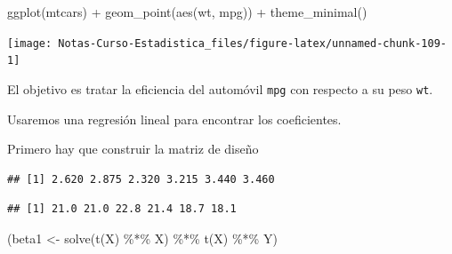 \documentclass[
  12pt,
]{book}
\newenvironment{Shaded}{\begin{snugshade}}{\end{snugshade}}
\newcommand{\FunctionTok}[1]{\textcolor[rgb]{0.00,0.00,0.00}{#1}}
\newcommand{\NormalTok}[1]{#1}
\newcommand{\OtherTok}[1]{\textcolor[rgb]{0.56,0.35,0.01}{#1}}
\newcommand{\SpecialCharTok}[1]{\textcolor[rgb]{0.00,0.00,0.00}{#1}}
\begin{document}
\begin{Shaded}
\begin{Highlighting}[]
\FunctionTok{ggplot}\NormalTok{(mtcars) }\SpecialCharTok{+} \FunctionTok{geom\_point}\NormalTok{(}\FunctionTok{aes}\NormalTok{(wt, mpg)) }\SpecialCharTok{+} \FunctionTok{theme\_minimal}\NormalTok{()}
\end{Highlighting}
\end{Shaded}

\begin{center}\texttt{[image: Notas-Curso-Estadistica\_files/figure-latex/unnamed-chunk-109-1]} \end{center}

El objetivo es tratar la eficiencia del automóvil \texttt{mpg} con
respecto a su peso \texttt{wt}.

Usaremos una regresión lineal para encontrar los coeficientes.

Primero hay que construir la matriz de diseño

\begin{Shaded}
\end{Shaded}

\begin{verbatim}
## [1] 2.620 2.875 2.320 3.215 3.440 3.460
\end{verbatim}

\begin{Shaded}
\end{Shaded}

\begin{verbatim}
## [1] 21.0 21.0 22.8 21.4 18.7 18.1
\end{verbatim}

\begin{Shaded}
\begin{Highlighting}[]
\NormalTok{(beta1 }\OtherTok{\textless{}{-}} \FunctionTok{solve}\NormalTok{(}\FunctionTok{t}\NormalTok{(X) }\SpecialCharTok{\%*\%}\NormalTok{ X) }\SpecialCharTok{\%*\%} \FunctionTok{t}\NormalTok{(X) }\SpecialCharTok{\%*\%}\NormalTok{ Y)}
\end{Highlighting}
\end{Shaded}
\end{document}
